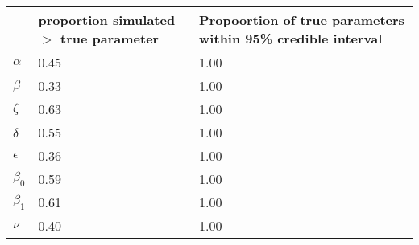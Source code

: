\begin{table}[ht]
\centering
\begin{tabular}{lp{1.5in}p{1.5in}}
  \hline
 & proportion simulated $>$ true parameter & Propoortion of true parameters 
 within 95\% credible interval \\ 
  \hline
$\alpha$ & 0.45 & 1.00 \\ 
  $\beta$ & 0.33 & 1.00 \\ 
  $\zeta$ & 0.63 & 1.00 \\ 
  $\delta$ & 0.55 & 1.00 \\ 
  $\epsilon$ & 0.36 & 1.00 \\ 
  $\beta_0$ & 0.59 & 1.00 \\ 
  $\beta_1$ & 0.61 & 1.00 \\ 
  $\nu$ & 0.40 & 1.00 \\ 
   \hline
\end{tabular}
\end{table}
